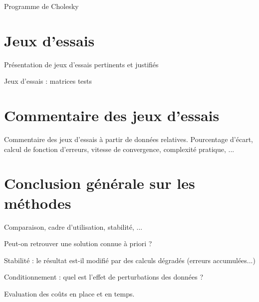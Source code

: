 \documentclass{article}
\begin{document}
\begin{boxedverbatim}
 Programme de Cholesky
\end{boxedverbatim}

\section{Jeux d'essais}

Présentation de jeux d'essais pertinents et justifiés

Jeux d'essais : matrices tests

\section{Commentaire des jeux d'essais}

Commentaire des jeux d'essais à partir de données relatives.
Pourcentage d'écart, calcul de fonction d'erreurs, vitesse de convergence, complexité pratique, ...

\section{Conclusion générale sur les méthodes}

Comparaison, cadre d'utilisation, stabilité, ...

Peut-on retrouver une solution connue à priori ?

Stabilité : le résultat est-il modifié par des calculs dégradés (erreurs accumulées...)

Conditionnement : quel est l'effet de perturbations des données ?

Evaluation des coûts en place et en temps.
\end{document}
